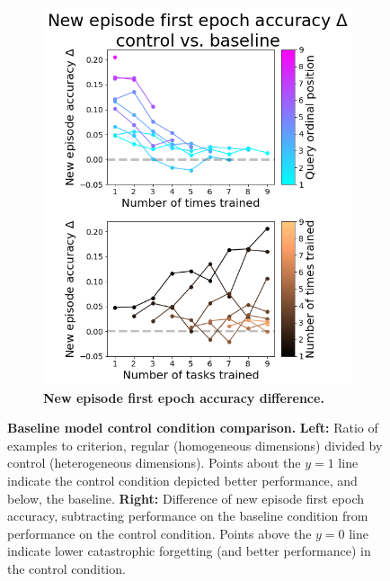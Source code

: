 \begin{figure}[!htb]
\begin{subfigure}{.49\textwidth}
    \includegraphics[width=\linewidth]{ch-results/figures/control_sequential/comparison_new_episode_accuracy.png}
    \caption{ {\bf New episode first epoch accuracy difference.}}
    \label{fig:results-control-sequential-comparison-new-episode-accuracy}
\end{subfigure}
\caption{{\bf Baseline model control condition comparison.} \textbf{Left:} Ratio of examples to criterion, regular (homogeneous dimensions) divided by control (heterogeneous dimensions). Points about the $y=1$ line indicate the control condition depicted better performance, and below, the baseline. \textbf{Right:} Difference of new episode first epoch accuracy, subtracting performance on the baseline condition from performance on the control condition. Points above the $y=0$ line indicate lower catastrophic forgetting (and better performance) in the control condition.}
\label{fig:results-control-comparison}
\vspace{-0.2in}
\end{figure}